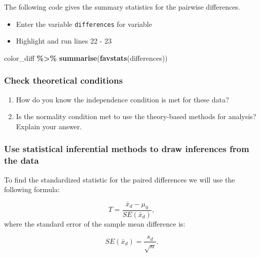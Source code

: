 \documentclass[
]{report}
\newenvironment{Shaded}{\begin{snugshade}}{\end{snugshade}}
\newcommand{\FunctionTok}[1]{\textcolor[rgb]{0.13,0.29,0.53}{\textbf{#1}}}
\newcommand{\NormalTok}[1]{#1}
\newcommand{\SpecialCharTok}[1]{\textcolor[rgb]{0.81,0.36,0.00}{\textbf{#1}}}
\begin{document}
The following code gives the summary statistics for the pairwise differences.

\begin{itemize}
\item
  Enter the variable \texttt{differences} for variable
\item
  Highlight and run lines 22 - 23
\end{itemize}

\begin{Shaded}
\begin{Highlighting}[]
\NormalTok{color\_diff }\SpecialCharTok{\%\textgreater{}\%} 
  \FunctionTok{summarise}\NormalTok{(}\FunctionTok{favstats}\NormalTok{(differences))}
\end{Highlighting}
\end{Shaded}

\subsubsection*{Check theoretical conditions}\label{check-theoretical-conditions-1}

\begin{enumerate}
\def\labelenumi{\arabic{enumi}.}
\setcounter{enumi}{4}
\item
  How do you know the independence condition is met for these data?
  \vspace{0.8in}
\item
  Is the normality condition met to use the theory-based methods for analysis? Explain your answer.
  \vspace{1in}
\end{enumerate}

\subsubsection*{Use statistical inferential methods to draw inferences from the data}\label{use-statistical-inferential-methods-to-draw-inferences-from-the-data-3}

To find the standardized statistic for the paired differences we will use the following formula:

\[T = \frac{\bar{x}_d - \mu_0}{SE(\bar{x}_d)},\]
where the standard error of the sample mean difference is:

\[SE(\bar{x}_d)=\frac{s_d}{\sqrt{n}}.\]
\end{document}
